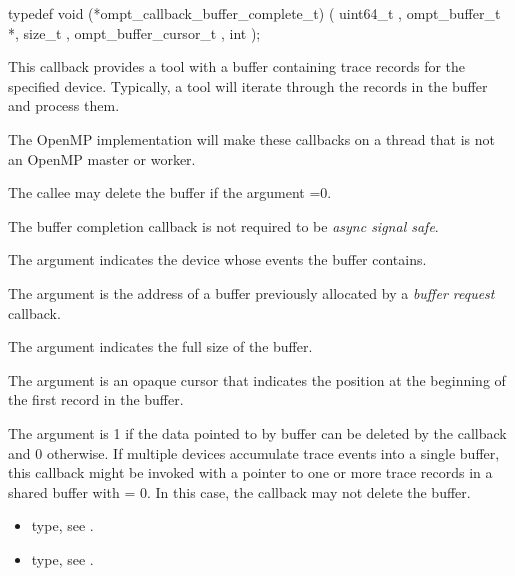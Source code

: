 \format

\begin{ccppspecific}
\begin{omptCallback}
typedef void (*ompt_callback_buffer_complete_t) (
  uint64_t ,
  ompt_buffer_t *,
  size_t ,
  ompt_buffer_cursor_t ,
  int 
);
\end{omptCallback}
\end{ccppspecific}


\descr 
This callback provides a tool with a buffer containing trace records for the
specified device. Typically, a tool will iterate through the records
in the buffer and process them.

The OpenMP implementation will make these callbacks
on a thread that is not an OpenMP master or worker. 

The callee may delete the buffer if the argument
=0.

The buffer completion callback is not 
required to be \emph{async signal safe}.

\argdesc

The argument  indicates the device whose events
the buffer contains.

The argument  is the address of a buffer previously
allocated by a \emph{buffer request} callback.

The argument  indicates the full size of the buffer.

The argument  is an opaque cursor that indicates the
position at the beginning of the first record in the buffer.

The argument  is 1 if the data pointed to by
buffer can be deleted by the callback and 0 otherwise. If multiple
devices accumulate trace events into a single buffer, this callback
might be invoked with a pointer to one or more trace records in a
shared buffer with  = 0. In this case, the callback
may not delete the buffer.

\crossreferences
\begin{itemize}
\item {} type, see
.
\item {} type, see
.
\end{itemize}

\label{sec:ompt_callback_control_tool_t}
\format

